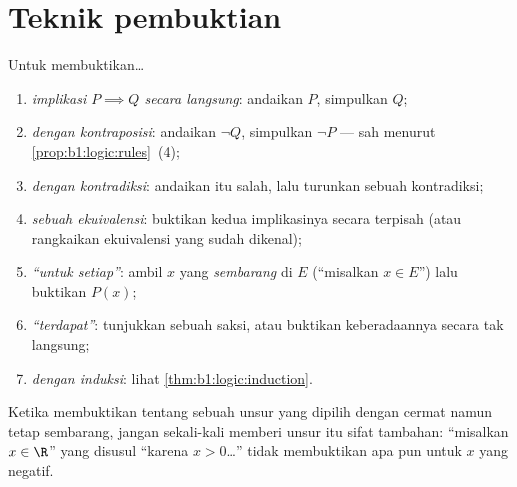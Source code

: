 \section{Teknik pembuktian}

\begin{method}\label{met:b1:logic:proofs}
Untuk membuktikan\dots
\begin{enumerate}
  \item \emph{implikasi $P \implies Q$ secara langsung}: andaikan $P$,
        simpulkan $Q$;
  \item \emph{dengan kontraposisi}: andaikan $\lnot Q$, simpulkan
        $\lnot P$ --- sah menurut \cref{prop:b1:logic:rules}~(4);
  \item \emph{dengan kontradiksi}: andaikan  itu salah, lalu
        turunkan sebuah kontradiksi;
  \item \emph{sebuah ekuivalensi}: buktikan kedua implikasinya secara
        terpisah (atau rangkaikan ekuivalensi yang sudah dikenal);
  \item \emph{ ``untuk setiap''}: ambil $x$ yang
        \emph{sembarang} di $E$ (``misalkan $x \in E$'') lalu buktikan
        $P(x)$;
  \item \emph{ ``terdapat''}: tunjukkan sebuah saksi, atau
        buktikan keberadaannya secara tak langsung;
  \item \emph{dengan induksi}: lihat \cref{thm:b1:logic:induction}.
\end{enumerate}
Ketika membuktikan  tentang sebuah unsur yang dipilih dengan
cermat namun tetap sembarang, jangan sekali-kali memberi unsur itu
sifat tambahan: ``misalkan $x \in \R$'' yang disusul ``karena
$x > 0$\dots'' tidak membuktikan apa pun untuk $x$ yang negatif.
\end{method}

